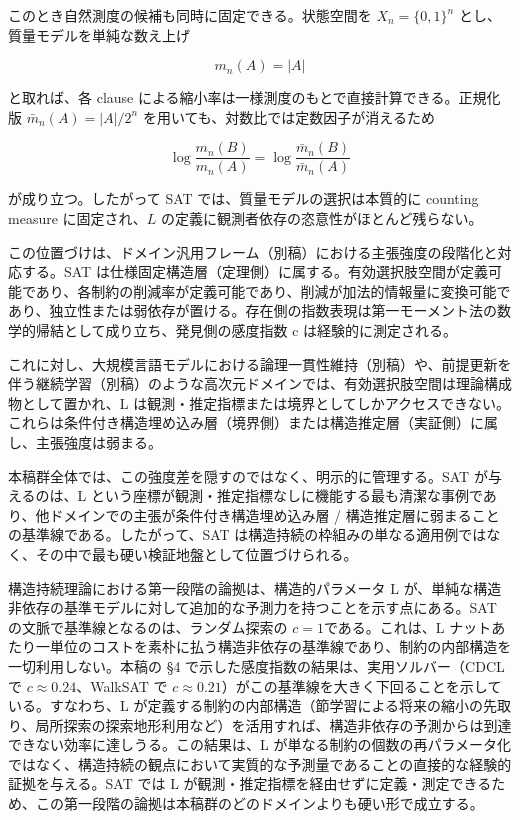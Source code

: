 \documentclass[12pt,a4paper]{article}
\begin{document}
このとき自然測度の候補も同時に固定できる。状態空間を \(X_{n}=\{0,1\}^n\) とし、質量モデルを単純な数え上げ

\[
m_{n}(A)=|A|
\]

と取れば、各 clause による縮小率は一様測度のもとで直接計算できる。正規化版 \(\bar m_{n}(A)=|A|/2^n\) を用いても、対数比では定数因子が消えるため

\[
\log \frac{m_{n}(B)}{m_{n}(A)}=\log \frac{\bar m_{n}(B)}{\bar m_{n}(A)}
\]

が成り立つ。したがって SAT では、質量モデルの選択は本質的に counting measure に固定され、\(L\) の定義に観測者依存の恣意性がほとんど残らない。

この位置づけは、ドメイン汎用フレーム（別稿）における主張強度の段階化と対応する。SAT は仕様固定構造層（定理側）に属する。有効選択肢空間が定義可能であり、各制約の削減率が定義可能であり、削減が加法的情報量に変換可能であり、独立性または弱依存が置ける。存在側の指数表現は第一モーメント法の数学的帰結として成り立ち、発見側の感度指数 c は経験的に測定される。

これに対し、大規模言語モデルにおける論理一貫性維持（別稿）や、前提更新を伴う継続学習（別稿）のような高次元ドメインでは、有効選択肢空間は理論構成物として置かれ、L は観測・推定指標または境界としてしかアクセスできない。これらは条件付き構造埋め込み層（境界側）または構造推定層（実証側）に属し、主張強度は弱まる。

本稿群全体では、この強度差を隠すのではなく、明示的に管理する。SAT が与えるのは、L という座標が観測・推定指標なしに機能する最も清潔な事例であり、他ドメインでの主張が条件付き構造埋め込み層 / 構造推定層に弱まることの基準線である。したがって、SAT は構造持続の枠組みの単なる適用例ではなく、その中で最も硬い検証地盤として位置づけられる。

構造持続理論における第一段階の論拠は、構造的パラメータ L が、単純な構造非依存の基準モデルに対して追加的な予測力を持つことを示す点にある。SAT の文脈で基準線となるのは、ランダム探索の \(c = 1\)である。これは、L ナットあたり一単位のコストを素朴に払う構造非依存の基準線であり、制約の内部構造を一切利用しない。本稿の §4 で示した感度指数の結果は、実用ソルバー（CDCL で \(c ≈ 0.24\)、WalkSAT で \(c ≈ 0.21\)）がこの基準線を大きく下回ることを示している。すなわち、L が定義する制約の内部構造（節学習による将来の縮小の先取り、局所探索の探索地形利用など）を活用すれば、構造非依存の予測からは到達できない効率に達しうる。この結果は、L が単なる制約の個数の再パラメータ化ではなく、構造持続の観点において実質的な予測量であることの直接的な経験的証拠を与える。SAT では L が観測・推定指標を経由せずに定義・測定できるため、この第一段階の論拠は本稿群のどのドメインよりも硬い形で成立する。
\end{document}
